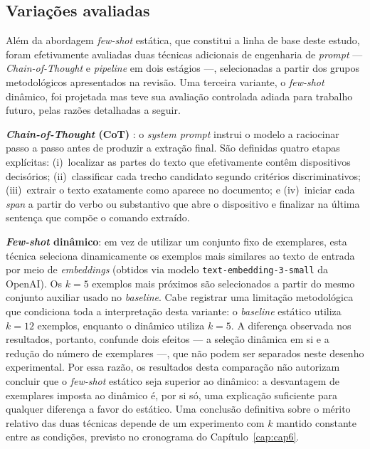 \subsection{Variações avaliadas}
\label{sec:variacoes_prompt}

Além da abordagem \textit{few-shot} estática, que constitui a linha de base deste estudo, foram efetivamente avaliadas duas técnicas adicionais de engenharia de \textit{prompt} --- \textit{Chain-of-Thought} e \textit{pipeline} em dois estágios ---, selecionadas a partir dos grupos metodológicos apresentados na revisão. Uma terceira variante, o \textit{few-shot} dinâmico, foi projetada mas teve sua avaliação controlada adiada para trabalho futuro, pelas razões detalhadas a seguir.

\textbf{\textit{Chain-of-Thought} (CoT)} \cite{wei2022chainofthought}: o \textit{system prompt} instrui o modelo a raciocinar passo a passo antes de produzir a extração final. São definidas quatro etapas explícitas: (i)~localizar as partes do texto que efetivamente contêm dispositivos decisórios; (ii)~classificar cada trecho candidato segundo critérios discriminativos; (iii)~extrair o texto exatamente como aparece no documento; e (iv)~iniciar cada \textit{span} a partir do verbo ou substantivo que abre o dispositivo e finalizar na última sentença que compõe o comando extraído.

\textbf{\textit{Few-shot} dinâmico}: em vez de utilizar um conjunto fixo de exemplares, esta técnica seleciona dinamicamente os exemplos mais similares ao texto de entrada por meio de \textit{embeddings} (obtidos via modelo \texttt{text-embedding-3-small} da OpenAI). Os $k = 5$ exemplos mais próximos são selecionados a partir do mesmo conjunto auxiliar usado no \textit{baseline}. Cabe registrar uma limitação metodológica que condiciona toda a interpretação desta variante: o \textit{baseline} estático utiliza $k = 12$ exemplos, enquanto o dinâmico utiliza $k = 5$. A diferença observada nos resultados, portanto, confunde dois efeitos --- a seleção dinâmica em si e a redução do número de exemplares ---, que não podem ser separados neste desenho experimental. Por essa razão, os resultados desta comparação não autorizam concluir que o \textit{few-shot} estático seja superior ao dinâmico: a desvantagem de exemplares imposta ao dinâmico é, por si só, uma explicação suficiente para qualquer diferença a favor do estático. Uma conclusão definitiva sobre o mérito relativo das duas técnicas depende de um experimento com $k$ mantido constante entre as condições, previsto no cronograma do Capítulo~\ref{cap:cap6}.

